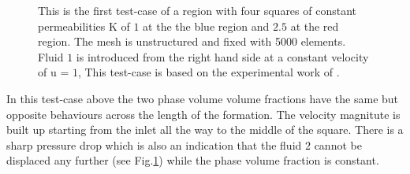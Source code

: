 \documentclass[preprint,authoryear,12pt]{elsarticle}
\begin{document}
\begin{figure}[h]
\begin{center}
\caption{This is the first test-case of a region with four squares of constant permeabilities K of $1$ at the the blue region and $2.5$ at the red region. The mesh is unstructured and fixed with 5000 elements. Fluid $1$ is introduced from the right hand side at a constant velocity of u = $1$, This test-case is based on the experimental work of \citet{evans_1994}.}
\label{fig:square}
\end{center}
\end{figure}

\noindent In this test-case above the two phase volume volume fractions have the same but opposite behaviours across the length of the formation. The velocity magnitute is built up starting from the inlet all the way to the middle of the square. There is a sharp pressure drop which is also an indication that the fluid $2$ cannot be displaced any further (see Fig.\ref{fig:square}) while the phase volume fraction is constant. 
\end{document}
